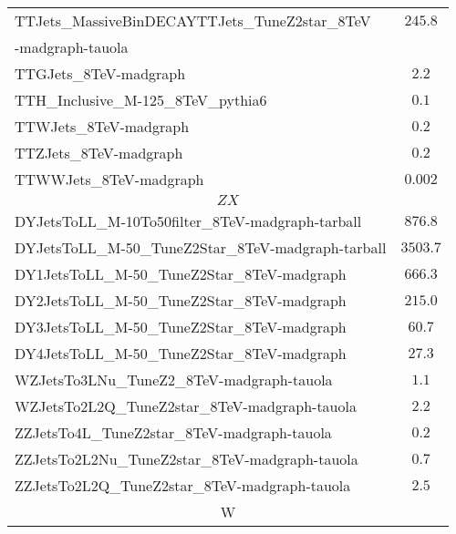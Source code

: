 \begin{table}[!Hhtb]
\begin{center}
{\begin{tabular}{|l|c|}
TTJets\_MassiveBinDECAYTTJets\_TuneZ2star\_8TeV  &  $245.8$       \\
-madgraph-tauola                                        &               \\
TTGJets\_8TeV-madgraph                                  &  $2.2$              \\%
TTH\_Inclusive\_M-125\_8TeV\_pythia6                    &  $0.1$               \\
TTWJets\_8TeV-madgraph                                  &  $0.2$              \\
TTZJets\_8TeV-madgraph                                  &  $0.2$                \\
TTWWJets\_8TeV-madgraph                                 &  $0.002$\\%

\hline
\multicolumn{2}{|c|}{$ZX$ }\\
\hline
DYJetsToLL\_M-10To50filter\_8TeV-madgraph-tarball      &   $876.8$               \\
DYJetsToLL\_M-50\_TuneZ2Star\_8TeV-madgraph-tarball    &   $3503.7$               \\
DY1JetsToLL\_M-50\_TuneZ2Star\_8TeV-madgraph           &   $666.3$               \\
DY2JetsToLL\_M-50\_TuneZ2Star\_8TeV-madgraph           &   $215.0$               \\
DY3JetsToLL\_M-50\_TuneZ2Star\_8TeV-madgraph           &   $60.7$               \\
DY4JetsToLL\_M-50\_TuneZ2Star\_8TeV-madgraph           &   $27.3$               \\
WZJetsTo3LNu\_TuneZ2\_8TeV-madgraph-tauola             &  $1.1$                \\
WZJetsTo2L2Q\_TuneZ2star\_8TeV-madgraph-tauola         &  $2.2$                \\
ZZJetsTo4L\_TuneZ2star\_8TeV-madgraph-tauola           &  $0.2$                \\
ZZJetsTo2L2Nu\_TuneZ2star\_8TeV-madgraph-tauola        &  $0.7$                \\
ZZJetsTo2L2Q\_TuneZ2star\_8TeV-madgraph-tauola         &  $2.5$                \\
\hline
\multicolumn{2}{|c|}{W}\\
\hline


\end{tabular}}
\end{center}
\end{table}
